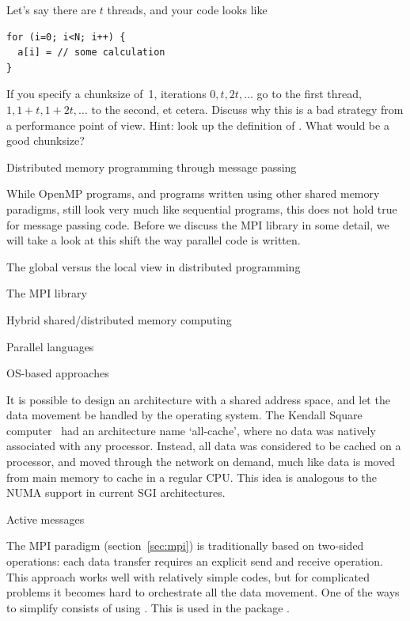 \begin{exercise}
Let's say there are $t$ threads, and your code looks like
\begin{verbatim}
for (i=0; i<N; i++) {
  a[i] = // some calculation
}
\end{verbatim}
If you specify a chunksize of~1,
iterations $0,t,2t,\ldots$ go to the first thread,
$1,1+t,1+2t,\ldots$ to the second, et cetera. Discuss why this is a bad
strategy from a performance point of view. Hint: look up the definition of
. What would be a good chunksize?
\end{exercise}


 {Distributed memory programming through message passing}

While OpenMP programs, and programs written using other shared memory
paradigms, still look very much like sequential programs, this does
not hold true for message passing code. Before we discuss the \acf{MPI}
library in some detail, we will take a look at this shift the way
parallel code is written.

 {The global versus the local view in distributed programming}
\label{sec:distributed-programming}


 {The MPI library}
\label{sec:mpi}


 {Hybrid shared/distributed memory computing}
\label{sec:hybrid}


 {Parallel languages}
\label{sec:pgas}


 {OS-based approaches}

It is possible to design an architecture with a shared address space,
and let the data movement be handled by the operating system. The
Kendall Square computer~\cite{KSRallcache} had an architecture name
`all-cache', where no data was natively associated with any
processor. Instead, all data was considered to be cached on a
processor, and moved through the network on demand, much like data is
moved from main memory to cache in a regular CPU. This idea 
is analogous to the \ac{NUMA} support in current SGI architectures.

 {Active messages}
\label{sec:charm++}

The MPI paradigm (section~\ref{sec:mpi}) is traditionally based on
two-sided operations: each data transfer requires an explicit send and
receive operation. This approach works well with relatively simple
codes, but for complicated problems it becomes hard to orchestrate all
the data movement. One of the ways to simplify consists of using
. This is used in the package
\cite{charmpp}.

